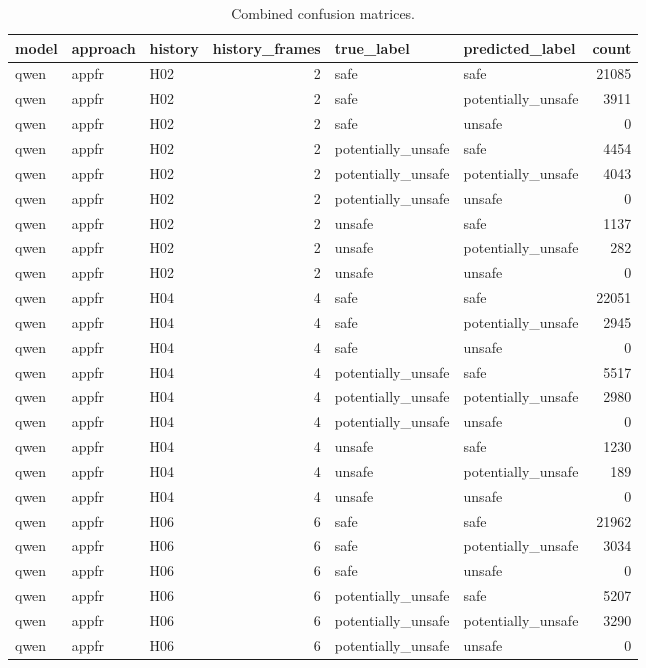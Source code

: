 \begin{table}[tbp]
\caption{Combined confusion matrices.}
\label{tab:rq1_confusion_matrices}
\begin{tabular}{lllrllr}
\toprule
model & approach & history & history\_frames & true\_label & predicted\_label & count \\
\midrule
qwen & appfr & H02 & 2 & safe & safe & 21085 \\
qwen & appfr & H02 & 2 & safe & potentially\_unsafe & 3911 \\
qwen & appfr & H02 & 2 & safe & unsafe & 0 \\
qwen & appfr & H02 & 2 & potentially\_unsafe & safe & 4454 \\
qwen & appfr & H02 & 2 & potentially\_unsafe & potentially\_unsafe & 4043 \\
qwen & appfr & H02 & 2 & potentially\_unsafe & unsafe & 0 \\
qwen & appfr & H02 & 2 & unsafe & safe & 1137 \\
qwen & appfr & H02 & 2 & unsafe & potentially\_unsafe & 282 \\
qwen & appfr & H02 & 2 & unsafe & unsafe & 0 \\
qwen & appfr & H04 & 4 & safe & safe & 22051 \\
qwen & appfr & H04 & 4 & safe & potentially\_unsafe & 2945 \\
qwen & appfr & H04 & 4 & safe & unsafe & 0 \\
qwen & appfr & H04 & 4 & potentially\_unsafe & safe & 5517 \\
qwen & appfr & H04 & 4 & potentially\_unsafe & potentially\_unsafe & 2980 \\
qwen & appfr & H04 & 4 & potentially\_unsafe & unsafe & 0 \\
qwen & appfr & H04 & 4 & unsafe & safe & 1230 \\
qwen & appfr & H04 & 4 & unsafe & potentially\_unsafe & 189 \\
qwen & appfr & H04 & 4 & unsafe & unsafe & 0 \\
qwen & appfr & H06 & 6 & safe & safe & 21962 \\
qwen & appfr & H06 & 6 & safe & potentially\_unsafe & 3034 \\
qwen & appfr & H06 & 6 & safe & unsafe & 0 \\
qwen & appfr & H06 & 6 & potentially\_unsafe & safe & 5207 \\
qwen & appfr & H06 & 6 & potentially\_unsafe & potentially\_unsafe & 3290 \\
qwen & appfr & H06 & 6 & potentially\_unsafe & unsafe & 0 \\

\end{tabular}
\end{table}
